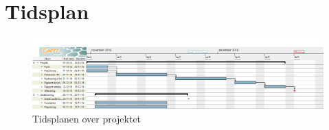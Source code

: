 \chapter{Tidsplan} \label{bilag:tidsplan}

\begin{figure}[h!]
	\centering
	\includegraphics[width=1\textwidth]{gantt/gantt.png}
	\caption{Tidsplanen over projektet}
	\label{fig:tidsplan}
\end{figure}